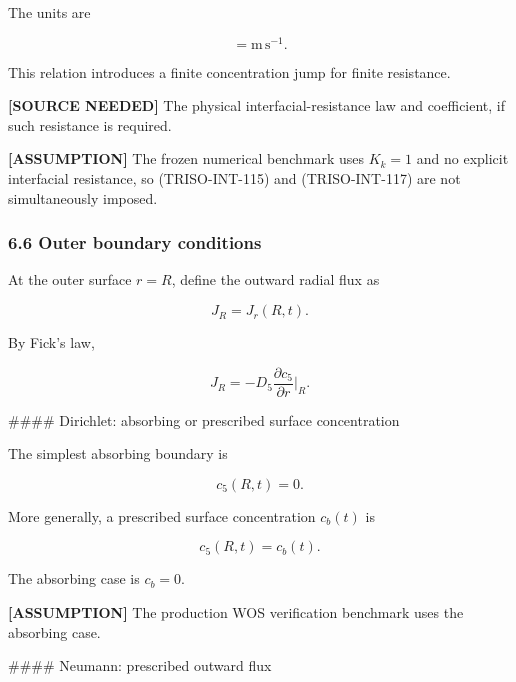 \documentclass[11pt,a4paper]{article}
\begin{document}
The units are

\begin{equation}
[h_{\mathrm{int}}]=\mathrm{m\,s^{-1}}.
\tag{TRISO-INT-118}
\label{eq:triso-int-118}
\end{equation}

This relation introduces a finite concentration jump for finite resistance.

\textbf{[SOURCE NEEDED]} The physical interfacial-resistance law and coefficient, if such resistance is required.

\textbf{[ASSUMPTION]} The frozen numerical benchmark uses $K_k=1$ and no explicit interfacial resistance, so (TRISO-INT-115) and (TRISO-INT-117) are not simultaneously imposed.

\subsubsection*{6.6 Outer boundary conditions}

At the outer surface $r=R$, define the outward radial flux as

\begin{equation}
J_R=J_r(R,t).
\tag{TRISO-BC-110}
\label{eq:triso-bc-110}
\end{equation}

By Fick's law,

\begin{equation}
J_R
=
-D_5
\frac{\partial c_5}{\partial r}
\bigg|_{R}.
\tag{TRISO-BC-111}
\label{eq:triso-bc-111}
\end{equation}

\#\#\#\# Dirichlet: absorbing or prescribed surface concentration

The simplest absorbing boundary is

\begin{equation}
\boxed{
c_5(R,t)=0.
}
\tag{TRISO-BC-112}
\label{eq:triso-bc-112}
\end{equation}

More generally, a prescribed surface concentration $c_b(t)$ is

\begin{equation}
c_5(R,t)=c_b(t).
\tag{TRISO-BC-113}
\label{eq:triso-bc-113}
\end{equation}

The absorbing case is $c_b=0$.

\textbf{[ASSUMPTION]} The production WOS verification benchmark uses the absorbing case.

\#\#\#\# Neumann: prescribed outward flux
\end{document}

